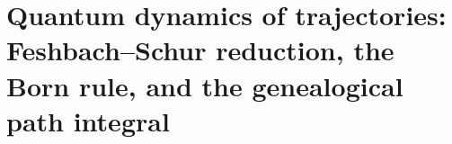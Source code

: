 \chapter{Quantum dynamics of trajectories: Feshbach--Schur reduction, the Born rule, and the genealogical path integral}
\label{chap:md-trayectorias-cuanticas-definitivo}


\begingroup
\let\HMTOwnerSection\section
\let\HMTOwnerSubsection\subsection
\let\HMTOwnerSubsubsection\subsubsection
\let\HMTOwnerParagraph\paragraph
\let\chapter\HMTOwnerSection
\let\section\HMTOwnerSubsection
\let\subsection\HMTOwnerSubsubsection
\let\subsubsection\HMTOwnerParagraph

\endgroup
\begingroup
\let\HMTOwnerSection\section
\let\HMTOwnerSubsection\subsection

